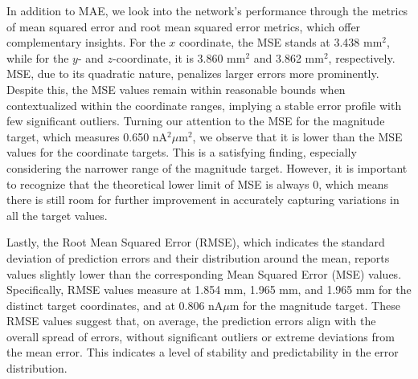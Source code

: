 \documentclass[a4paper, UKenglish, 11pt]{uiomaster}
\begin{document}
In addition to MAE, we look into the network's performance through the metrics of mean squared error and root mean squared error metrics, which offer complementary insights. For the $x$ coordinate, the MSE stands at 3.438 mm$^2$, while for the $y$- and $z$-coordinate, it is 3.860 mm$^2$ and 3.862 mm$^2$, respectively. MSE, due to its quadratic nature, penalizes larger errors more prominently. Despite this, the MSE values remain within reasonable bounds when contextualized within the coordinate ranges, implying a stable error profile with few significant outliers. Turning our attention to the MSE for the magnitude target, which measures 0.650 nA$^2\mu$m$^2$, we observe that it is lower than the MSE values for the coordinate targets. This is a satisfying finding, especially considering the narrower range of the magnitude target. However, it is important to recognize that the theoretical lower limit of MSE is always 0, which means there is still room for further improvement in accurately capturing variations in all the target values.

Lastly, the Root Mean Squared Error (RMSE), which indicates the standard deviation of prediction errors and their distribution around the mean, reports values slightly lower than the corresponding Mean Squared Error (MSE) values. Specifically, RMSE values measure at 1.854 mm, 1.965 mm, and 1.965 mm for the distinct target coordinates, and at 0.806 nA$\mu$m for the magnitude target. These RMSE values suggest that, on average, the prediction errors align with the overall spread of errors, without significant outliers or extreme deviations from the mean error. This indicates a level of stability and predictability in the error distribution.
\end{document}

